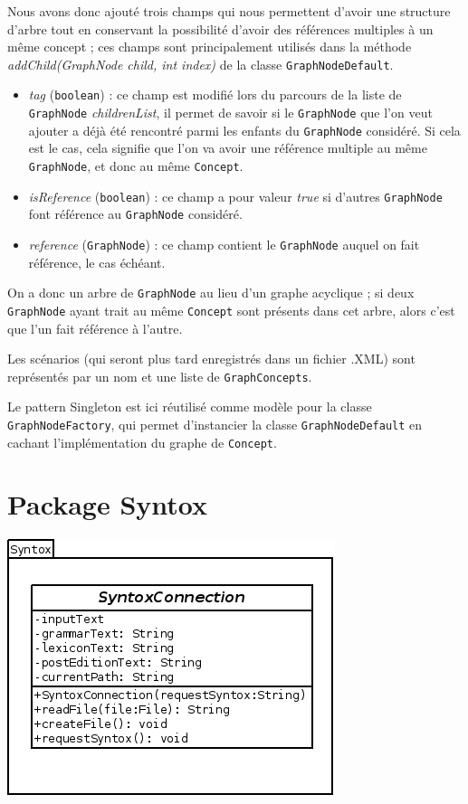 \documentclass[12pt]{report}
\begin{document}
Nous avons donc ajouté trois champs qui nous permettent d'avoir une structure d'arbre tout en conservant la possibilité d'avoir des références multiples à un même concept ; ces champs sont principalement utilisés dans la méthode \emph{addChild(GraphNode child, int index)} de la classe \texttt{GraphNodeDefault}.
\begin{itemize}
\item \emph{tag} (\texttt{boolean}) : ce champ est modifié lors du parcours de la liste de \texttt{GraphNode} \emph{childrenList}, il permet de savoir si le \texttt{GraphNode} que l'on veut ajouter a déjà été rencontré parmi les enfants du \texttt{GraphNode} considéré. Si cela est le cas, cela signifie que l'on va avoir une référence multiple au même \texttt{GraphNode}, et donc au même \texttt{Concept}.
\item \emph{isReference} (\texttt{boolean}) : ce champ a pour valeur \emph{true} si d'autres \texttt{GraphNode} font référence au \texttt{GraphNode} considéré.
\item \emph{reference} (\texttt{GraphNode}) : ce champ contient le \texttt{GraphNode} auquel on fait référence, le cas échéant.
\end{itemize}

On a donc un arbre de \texttt{GraphNode} au lieu d'un graphe acyclique ; si deux \texttt{GraphNode} ayant trait au même \texttt{Concept} sont présents dans cet arbre, alors c'est que l'un fait référence à l'autre.

\bigskip 
Les scénarios (qui seront plus tard enregistrés dans un fichier .XML) sont représentés par un nom et une liste de \texttt{GraphConcepts}.

\bigskip
Le pattern Singleton est ici réutilisé comme modèle pour la classe \texttt{GraphNodeFactory}, qui permet d'instancier la classe \texttt{GraphNodeDefault} en cachant l'implémentation du graphe de \texttt{Concept}.

\section{Package Syntox}
 
\begin{center}
\includegraphics[scale=0.6]{diversuml/SyntoxConnection.png}
\end{center}
\end{document}
